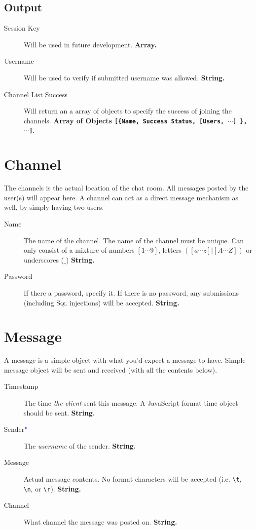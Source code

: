 \documentclass[12pt]{scrartcl}
\newcommand{\reqalt}{\textcolor{blue}{*}}
\begin{document}
\subsection{Output}
\begin{description}
    \item[Session Key] Will be used in future development. \textbf{Array.}
    \item[Username] Will be used to verify if submitted username was allowed. \textbf{String.}
    \item[Channel List Success] Will return an a array of objects to specify the success of joining the channels. \textbf{Array of Objects \texttt{[\{Name, Success Status, [Users, $\cdots$] \}, $\cdots$]}.}
\end{description}


\section{Channel}\label{sec:channel}
The channels is the actual location of the chat room. All messages posted by the user(s) will appear here. A channel can act as a direct message mechanism as well, by simply having two users.

\begin{description}
    \item[Name] The name of the channel. The name of the channel must be unique. Can only consist of a mixture of numbers $[1 \cdots 9]$, letters $([a \cdots z] | [A \cdots Z])$ or underscores ($\_$)  \textbf{String.}
    \item[Password] If there a password, specify it. If there is no password, any submissions (including \textsc{Sql} injections) will be accepted. \textbf{String.}
\end{description}


\section{Message}
A message is a simple object with what you'd expect a message to have. Simple message object will be sent and received (with all the contents below).

\begin{description}
    \item[Timestamp] The time \textit{the client} sent this message. A JavaScript format time object should be sent. \textbf{String.}
    \item[Sender\reqalt] The \textit{username} of the sender. \textbf{String.}
    \item[Message] Actual message contents. No format characters will be accepted (i.e. \texttt{\textbackslash t}, \texttt{\textbackslash n}, or \texttt{\textbackslash r}). \textbf{String.}
    \item[Channel] What channel the message was posted on. \textbf{String.}
\end{description}
\end{document}
